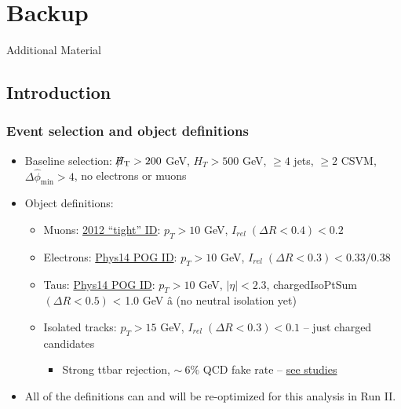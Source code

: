 \documentclass{beamer}
\begin{document}
\section{Backup}
\begin{frame}
  \begin{center}
    {\Large Additional Material}
  \end{center}
\end{frame}



\subsection{Introduction}
\begin{frame}
  \frametitle{Event selection and object definitions}
  \begin{itemize}
  \item Baseline selection: $\slash\mkern-12mu{H}_{\text{T}}>200$ GeV,
    $H_{T}>500$ GeV, $\geq4$ jets, $\geq2$ CSVM,
    $\Delta\hat{\phi}_{\mathrm{min}}>4$, no electrons or muons
  \item Object definitions:
    \begin{itemize}
    \item Muons: \href{https://twiki.cern.ch/twiki/bin/view/CMSPublic/SWGuideMuonId\#Tight\_Muon}{2012 ``tight'' ID}: $p_T > 10$ GeV, $I_{rel}\; (\Delta R<0.4) < 0.2$    
    \item Electrons: \href{https://twiki.cern.ch/twiki/bin/viewauth/CMS/CutBasedElectronIdentificationRun2\#CSA14\_selection\_conditions\_25ns}{Phys14 POG ID}:  $p_T > 10$ GeV, $I_{rel}\;
      (\Delta R<0.3) < 0.33 / 0.38$
    \item Taus: \href{https://indico.cern.ch/event/359233/contribution/4/material/slides/0.pdf}{Phys14 POG ID}: $p_T > 10$ GeV, $|\eta| < 2.3$,
      chargedIsoPtSum $(\Delta R<0.5)$ < 1.0 GeV â (no neutral isolation yet)
    \item Isolated tracks: $p_T > 15$ GeV, $I_{rel}\;(\Delta R<0.3) < 0.1$ -- just charged candidates
      \begin{itemize}
      \item Strong ttbar rejection, $\sim~6\%$ QCD fake rate -- \href{https://indico.cern.ch/event/334949/contribution/1/material/slides/0.pdf}{see studies}
      \end{itemize}

    \end{itemize}
  \item All of the definitions can and will be re-optimized for this
    analysis in Run II.
  \end{itemize}
\end{frame}
\end{document}
